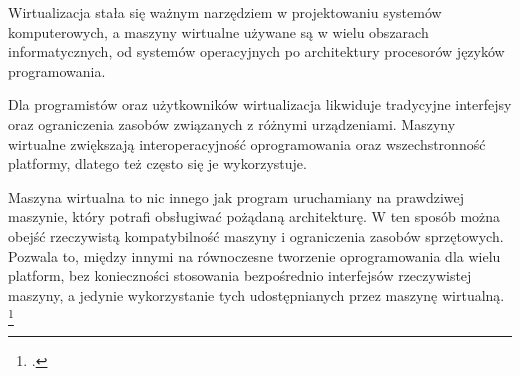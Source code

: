 \documentclass[a4paper]{article}
\begin{document}
\par Wirtualizacja stała się ważnym narzędziem w projektowaniu systemów komputerowych, a maszyny wirtualne używane są w wielu obszarach informatycznych, od systemów operacyjnych po architektury procesorów języków programowania.
\par Dla programistów oraz użytkowników wirtualizacja likwiduje tradycyjne interfejsy oraz ograniczenia zasobów związanych z różnymi urządzeniami. Maszyny wirtualne zwiększają interoperacyjność oprogramowania oraz wszechstronność platformy, dlatego też często się je wykorzystuje.
\par Maszyna wirtualna to nic innego jak program uruchamiany na prawdziwej maszynie, który potrafi obsługiwać pożądaną architekturę. W ten sposób można obejść rzeczywistą kompatybilność maszyny i ograniczenia zasobów sprzętowych. Pozwala to, między innymi na równoczesne tworzenie oprogramowania dla wielu platform, bez konieczności stosowania bezpośrednio interfejsów rzeczywistej maszyny, a jedynie wykorzystanie tych udostępnianych przez maszynę wirtualną. \footcite{Smith2005}
\end{document}
